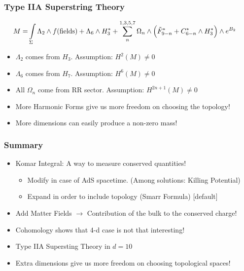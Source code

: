 \documentclass[t]{beamer}
\begin{document}
\begin{frame}
\frametitle{Type IIA Superstring Theory}

{\small
\begin{align}
M = &\int\limits_{\Sigma} \Lambda_2 \wedge f(\text{fields}) + \Lambda_6 \wedge H^{*}_3 + \sum_{n}^{1,3,5,7} \Omega_n \wedge \Big( \tilde{F}^{*}_{9-n} + C^{*}_{6-n} \wedge H^{*}_3  \Big) \wedge e^{B_2} \notag
\end{align}}

\begin{itemize}
\setlength{\parskip}{10pt}

\item<2-> $\Lambda_2$ comes from $H_3$. Assumption: $H^2(M) \not= 0$
\item<2-> $\Lambda_6$ comes from $H_7$. Assumption: $H^6(M) \not= 0$
\item<2-> All $\Omega_n$ come from RR sector. Assumption: $H^{2n+1}(M) \not= 0$
\item<3-> More Harmonic Forms give us more freedom on choosing the topology!
\item<4-> More dimensions can easily produce a non-zero mass!

\end{itemize}


\end{frame}


\begin{frame}
\frametitle{Summary}

\begin{itemize}
\setlength{\parskip}{10pt}
\item<1-> Komar Integral: A way to measure conserved quantities!

\begin{itemize}
[triangle]
\setlength{\parskip}{5pt}
\item Modify in case of AdS spacetime. (Among solutions: Killing Potential)
\item Expand in order to include topology (Smarr Formula)
[default]
\end{itemize}

\item<2->  Add Matter Fields $\rightarrow$ Contribution of the bulk to the conserved charge!

\item<3->  Cohomology shows that 4-d case is not that interesting!

\item<4->  Type IIA Supersting Theory in $d=10$

\item<5->  Extra dimensions give us more freedom on choosing topological spaces!

\end{itemize}
\end{frame}
\end{document}
